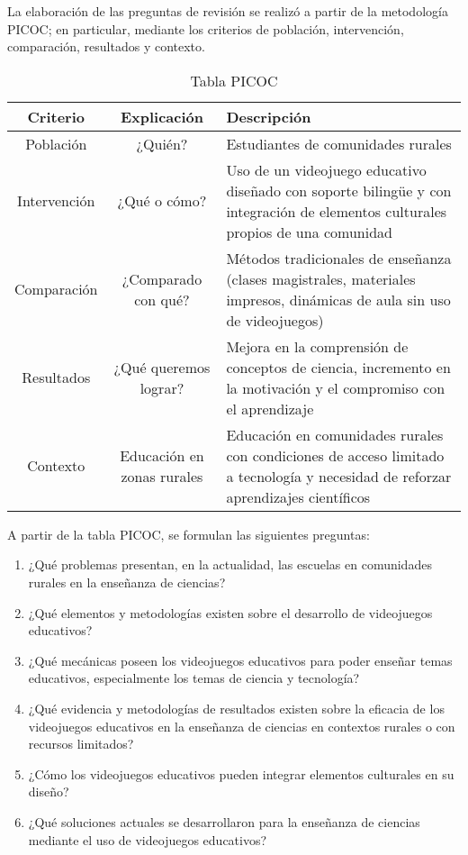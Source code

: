 La elaboración de las preguntas de revisión se realizó a partir de la metodología PICOC; en particular, mediante los criterios de población, intervención, comparación, resultados y contexto.

\begin{table}[H]
    \centering
    \begin{tabularx}{\textwidth}{|c|c|X|}
        \hline
        Criterio & Explicación & Descripción \\ \hline
        Población & ¿Quién? & Estudiantes de comunidades rurales \\ \hline
        Intervención & ¿Qué o cómo? & Uso de un videojuego educativo diseñado con soporte bilingüe y con integración de elementos culturales propios de una comunidad \\ \hline
        Comparación & ¿Comparado con qué? & Métodos tradicionales de enseñanza (clases magistrales, materiales impresos, dinámicas de aula sin uso de videojuegos) \\ \hline
        Resultados & ¿Qué queremos lograr? & Mejora en la comprensión de conceptos de ciencia, incremento en la motivación y el compromiso con el aprendizaje \\ \hline
        Contexto & Educación en zonas rurales & Educación en comunidades rurales con condiciones de acceso limitado a tecnología y necesidad de reforzar aprendizajes científicos \\ \hline
    \end{tabularx}
    \caption{Tabla PICOC}
    \label{tab:placeholder}
\end{table}

A partir de la tabla PICOC, se formulan las siguientes preguntas:

\begin{enumerate}
    \item ¿Qué problemas presentan, en la actualidad, las escuelas en comunidades rurales en la enseñanza de ciencias?
    \item ¿Qué elementos y metodologías existen sobre el desarrollo de videojuegos educativos?
    \item ¿Qué mecánicas poseen los videojuegos educativos para poder enseñar temas educativos, especialmente los temas de ciencia y tecnología?
    \item ¿Qué evidencia y metodologías de resultados existen sobre la eficacia de los videojuegos educativos en la enseñanza de ciencias en contextos rurales o con recursos limitados?
    \item ¿Cómo los videojuegos educativos pueden integrar elementos culturales en su diseño?
    \item ¿Qué soluciones actuales se desarrollaron para la enseñanza de ciencias mediante el uso de videojuegos educativos?
\end{enumerate}

